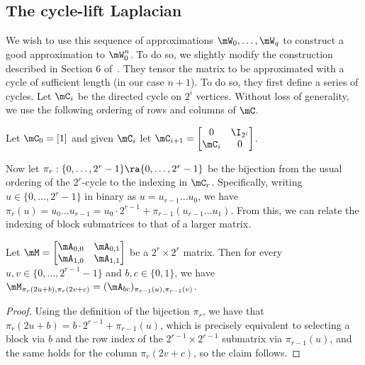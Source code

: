 \subsection{The cycle-lift Laplacian}
We wish to use this sequence of approximations $\mW_0,\ldots,\mW_q$ to construct a good approximation to $\mW_0^n$. To do so, we slightly modify the construction described in Section 6 of~\cite{AhmadinejadKeMuPeSiVa19}. They tensor the matrix to be approximated with a cycle of sufficient length (in our case $n+1$). To do so, they first define a series of cycles. Let $\mC_i$ be the directed cycle on $2^i$ vertices. Without loss of generality, we use the following ordering of rows and columns of $\mC$.

\begin{definition}
Let $\mC_0=[1]$ and given $\mC_i$ let $\mC_{i+1}=\begin{bmatrix}0&\I_{2^i}\\ \mC_{i}&0\end{bmatrix}$.
\end{definition}
Now let $\pi_r:\{0,\ldots,2^r-1\}\ra\{0,\ldots,2^r-1\}$ be the bijection from the usual ordering of the $2^r$-cycle to the indexing in $\mC_r$. Specifically, writing $u\in \{0,\ldots,2^{r}-1\}$ in binary as $u=u_{r-1}\ldots u_0$, we have $\pi_r(u)=u_0\ldots u_{r-1}=u_0\cdot 2^{r-1}+\pi_{r-1}(u_{r-1}\ldots u_1)$. From this, we can relate the indexing of block submatrices to that of a larger 
matrix. %
\begin{claim}\label{clm:indexStruct}
Let $\mM=\begin{bmatrix}\mA_{0,0} & \mA_{0,1}\\ \mA_{1,0} & \mA_{1,1}\end{bmatrix}$ be a $2^r\times 2^r$ matrix. Then for every $u,v\in \{0,\ldots,2^{r-1}-1\}$ and $b,c\in \{0,1\}$, we have $\mM_{\pi_r(2u+b),\pi_r(2v+c)}=(\mA_{bc})_{\pi_{r-1}(u),\pi_{r-1}(v)}$.
\end{claim}
\begin{proof}
Using the definition of the bijection $\pi_r$, we have that $\pi_r(2u+b)=b\cdot 2^{r-1}+\pi_{r-1}(u)$, which is precisely equivalent to selecting a block via $b$ and the row index of the $2^{r-1}\times 2^{r-1}$ submatrix via $\pi_{r-1}(u)$, and the same holds for the column $\pi_r(2v+c)$, so the claim follows.
\end{proof}


